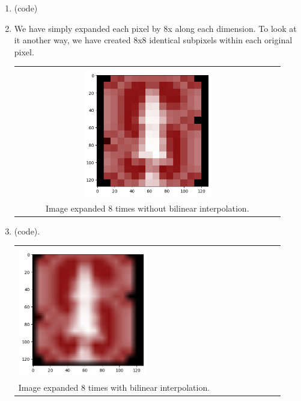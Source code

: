 \documentclass{article}
\begin{document}
\begin{enumerate}[label=(\roman*)]
\pagebreak

\item %
(code)

\item %
We have simply expanded each pixel by 8x along each dimension. To look at it another way, we have created 8x8 identical subpixels within each original pixel.

\begin{tabular}[t]{c}
	\hline \\
	\includegraphics[width=0.5\textwidth]{img/favicon_upscale_8x.png} \\
	Image expanded 8 times without bilinear interpolation. \\
	\hline
\end{tabular}

\item %
(code).

\begin{tabular}[t]{l}
	\hline \\
	\includegraphics[width=0.5\textwidth]{img/favicon_bilinear_8x.png} \\
	Image expanded 8 times with bilinear interpolation. \\
	\hline
\end{tabular}


\end{enumerate}
\end{document}
